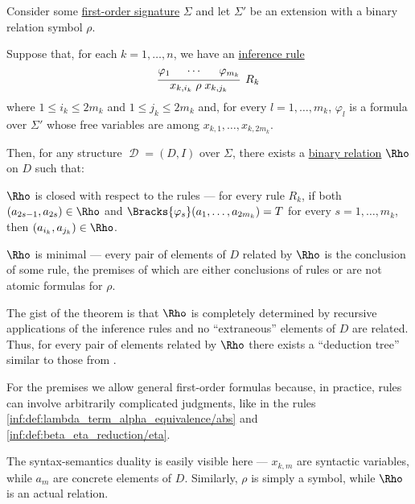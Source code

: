 \begin{theorem}\label{thm:recursively_defined_relations}
  Consider some \hyperref[def:first_order_signature]{first-order signature} \( \Sigma \) and let \( \Sigma' \) be an extension with a binary relation symbol \( \rho \).

  Suppose that, for each \( k = 1, \ldots, n \), we have an \hyperref[def:inference_rule]{inference rule}
  \begin{equation*}
    \begin{prooftree}
      \hypo{ \varphi_1 }
      \hypo{ \cdots }
      \hypo{ \varphi_{m_k} }
      \infer3[\( R_k \)]{ x_{k,i_k} \mathrel{\rho} x_{k,j_k} },
    \end{prooftree}
  \end{equation*}
  where \( 1 \leq i_k \leq 2m_k \) and \( 1 \leq j_k \leq 2m_k \) and, for every \( l = 1, \ldots, m_k \), \( \varphi_l \) is a formula over \( \Sigma' \) whose free variables are among \( x_{k,1}, \ldots, x_{k,2m_k} \).

  Then, for any structure \( \mscrD = (D, I) \) over \( \Sigma \), there exists a \hyperref[def:binary_relation]{binary relation} \( \Rho \) on \( D \) such that:
  \begin{thmenum}
     \( \Rho \) is closed with respect to the rules --- for every rule \( R_k \), if both \( (a_{2s - 1}, a_{2s}) \in \Rho \) and \( \Bracks{\varphi_s}(a_1, \ldots, a_{2m_k}) = T \) for every \( s = 1, \ldots, m_k \), then \( (a_{i_k}, a_{j_k}) \in \Rho \).

     \( \Rho \) is minimal --- every pair of elements of \( D \) related by \( \Rho \) is the conclusion of some rule, the premises of which are either conclusions of rules or are not atomic formulas for \( \rho \).
  \end{thmenum}
\end{theorem}
\begin{comments}
  \item The gist of the theorem is that \( \Rho \) is completely determined by recursive applications of the inference rules and no \enquote{extraneous} elements of \( D \) are related. Thus, for every pair of elements related by \( \Rho \) there exists a \enquote{deduction tree} similar to those from .

  \item For the premises we allow general first-order formulas because, in practice, rules can involve arbitrarily complicated judgments, like in the rules \ref{inf:def:lambda_term_alpha_equivalence/abs} and \ref{inf:def:beta_eta_reduction/eta}.

  \item The syntax-semantics duality is easily visible here --- \( x_{k,m} \) are syntactic variables, while \( a_m \) are concrete elements of \( D \). Similarly, \( \rho \) is simply a symbol, while \( \Rho \) is an actual relation.
\end{comments}
